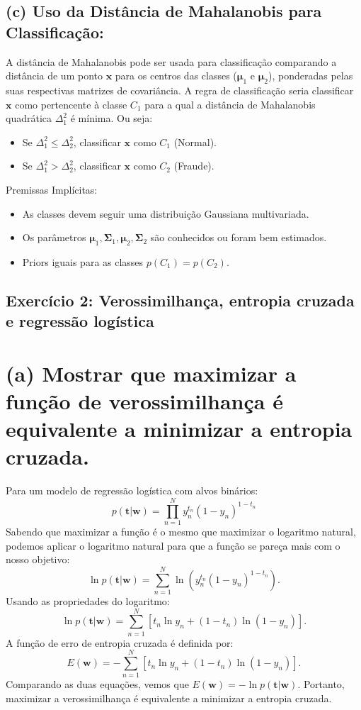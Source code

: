 \documentclass[conference]{IEEEtran}
\begin{document}
\subsection*{(c) Uso da Distância de Mahalanobis para Classificação:}
A distância de Mahalanobis pode ser usada para classificação comparando a distância de um ponto \(\mathbf{x}\) para os centros das classes (\(\boldsymbol{\mu}_1\) e \(\boldsymbol{\mu}_2\)), ponderadas pelas suas respectivas matrizes de covariância. A regra de classificação seria classificar \(\mathbf{x}\) como pertencente à classe \(C_1\) para a qual a distância de Mahalanobis quadrática \(\Delta_1^2\) é mínima. Ou seja:
\begin{itemize}
    \item Se \(\Delta_1^2 \leqslant \Delta_2^2\), classificar \(\mathbf{x}\) como \(C_1\) (Normal).
    \item Se \(\Delta_1^2 > \Delta_2^2\), classificar \(\mathbf{x}\) como \(C_2\) (Fraude).
\end{itemize}

Premissas Implícitas:
\begin{itemize}
    \item As classes devem seguir uma distribuição Gaussiana multivariada. 
    \item Os parâmetros $\boldsymbol{\mu}_1, \boldsymbol{\Sigma}_1, \boldsymbol{\mu}_2, \boldsymbol{\Sigma}_2$ são conhecidos ou foram bem estimados.
    \item Priors iguais para as classes \(p(C_1) = p(C_2)\).
\end{itemize}

\subsection{Exercício 2: Verossimilhança, entropia cruzada e regressão logística}
\label{subsec:ex2}
\section*{(a) Mostrar que maximizar a função de verossimilhança é equivalente a minimizar a entropia cruzada.}
Para um modelo de regressão logística com alvos binários:
\[
p(\mathbf{t} | \mathbf{w}) = \prod_{n=1}^{N} y_n^{t_n} (1 - y_n)^{1 - t_n}
\]
Sabendo que maximizar a função é o mesmo que maximizar o logaritmo natural, podemos aplicar o logaritmo natural para que a função se pareça mais com o nosso objetivo:
\[
\ln p(\mathbf{t} | \mathbf{w}) = \sum_{n=1}^{N} \ln \left( y_n^{t_n} (1 - y_n)^{1 - t_n} \right).
\]
Usando as propriedades do logaritmo:
\[
\ln p(\mathbf{t} | \mathbf{w}) = \sum_{n=1}^{N} \left[ t_n \ln y_n + (1 - t_n) \ln(1 - y_n) \right].
\]
A função de erro de entropia cruzada é definida por:
\[
E(\mathbf{w}) = -\sum_{n=1}^{N} \left[ t_n \ln y_n + (1 - t_n) \ln(1 - y_n) \right].
\]
Comparando as duas equações, vemos que $E(\mathbf{w}) = -\ln p(\mathbf{t} | \mathbf{w})$. Portanto, maximizar a verossimilhança é equivalente a minimizar a entropia cruzada.
\end{document}
